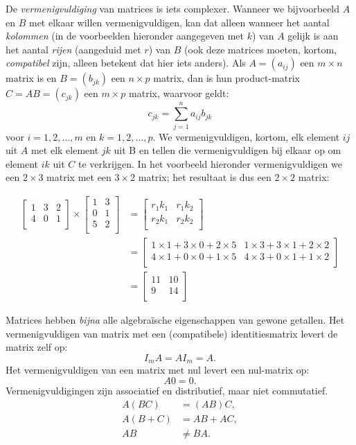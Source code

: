De \textit{vermenigvuldiging} van matrices is iets complexer. Wanneer we bijvoorbeeld $A$ en $B$ met elkaar willen vermenigvuldigen, kan dat alleen wanneer het aantal \textit{kolommen} (in de voorbeelden hieronder aangegeven met $k$) van $A$ gelijk is aan het aantal \textit{rijen} (aangeduid met $r$) van $B$ (ook deze matrices moeten, kortom, \textit{compatibel} zijn, alleen betekent dat hier iets anders). Als $A=(a_{ij})$ een $m \times n$ matrix is en $B=(b_{jk})$ een $n \times p$ matrix, dan is hun product-matrix $C=AB=(c_{jk})$ een $m \times p$ matrix, waarvoor geldt:
%
\[
c_{jk} = \sum_{j=1}^n{a_{ij}b_{jk}}
\]
%
voor $i=1,2,\hdots,m$ en $k=1, 2, \hdots, p$. We vermenigvuldigen, kortom, elk element $ij$ uit $A$ met elk element $jk$ uit B en tellen die vermenigvuldigen bij elkaar op om element $ik$ uit $C$ te verkrijgen. In het voorbeeld hieronder vermenigvuldigen we een $2 \times 3$ matrix met een $3 \times 2$ matrix; het resultaat is dus een $2 \times 2$ matrix:


\[
\begin{aligned}
\begin{bmatrix}
1 & 3 & 2 \\
4 & 0 & 1 \\
\end{bmatrix} \times
\begin{bmatrix} 
1 & 3 \\
0 & 1 \\
5 & 2 \\
\end{bmatrix} &=
\begin{bmatrix}
r_1k_1 & r_1k_2 \\
r_2k_1 & r_2k_2 \\
\end{bmatrix} \\
&=
\begin{bmatrix}
1 \times 1 + 3 \times 0 + 2 \times 5 & 1 \times 3 + 3 \times 1 + 2 \times 2 \\
4 \times 1 + 0 \times 0 + 1 \times 5 & 4 \times 3 + 0 \times 1 + 1 \times 2 \\
\end{bmatrix} \\
&= 
\begin{bmatrix}
11 & 10 \\
9 & 14 \\
\end{bmatrix}
\end{aligned}
\]

Matrices hebben \textit{bijna} alle algebraïsche eigenschappen van gewone getallen. Het vermenigvuldigen van matrix met een (compatibele) identitiesmatrix levert de matrix zelf op:
%
\[
I_mA = AI_m = A.
\]
%
Het vermenigvuldigen van een matrix met nul levert een nul-matrix op:
%
\[
A0 = 0.
\]
%
Vermenigvuldigingen zijn associatief en distributief, maar niet commutatief.
%
\[
\begin{aligned}
A(BC) &= (AB)C,\\
A(B+C) &= AB + AC, \\
AB &\neq BA.
\end{aligned}
\]
%

